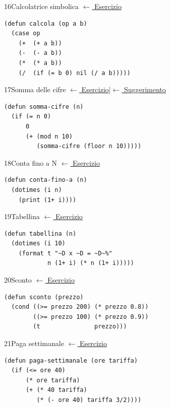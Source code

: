 \label{sol:16}
\begin{solbox}{16}{Calcolatrice simbolica}
\small\color{black!55}\hyperref[ex:16]{$\leftarrow$ Esercizio}\normalsize\color{black}
\begin{lstlisting}
(defun calcola (op a b)
  (case op
    (+  (+ a b))
    (-  (- a b))
    (*  (* a b))
    (/  (if (= b 0) nil (/ a b)))))
\end{lstlisting}
\end{solbox}

\label{sol:17}
\begin{solbox}{17}{Somma delle cifre}
\small\color{black!55}\hyperref[ex:17]{$\leftarrow$ Esercizio}\enspace\textcolor{black!30}{|}\enspace\hyperref[hint:17]{$\leftarrow$ Suggerimento}\normalsize\color{black}
\begin{lstlisting}
(defun somma-cifre (n)
  (if (= n 0)
      0
      (+ (mod n 10)
         (somma-cifre (floor n 10)))))
\end{lstlisting}
\end{solbox}

\label{sol:18}
\begin{solbox}{18}{Conta fino a N}
\small\color{black!55}\hyperref[ex:18]{$\leftarrow$ Esercizio}\normalsize\color{black}
\begin{lstlisting}
(defun conta-fino-a (n)
  (dotimes (i n)
    (print (1+ i))))
\end{lstlisting}
\end{solbox}

\label{sol:19}
\begin{solbox}{19}{Tabellina}
\small\color{black!55}\hyperref[ex:19]{$\leftarrow$ Esercizio}\normalsize\color{black}
\begin{lstlisting}
(defun tabellina (n)
  (dotimes (i 10)
    (format t "~D x ~D = ~D~%"
            n (1+ i) (* n (1+ i)))))
\end{lstlisting}
\end{solbox}

\label{sol:20}
\begin{solbox}{20}{Sconto}
\small\color{black!55}\hyperref[ex:20]{$\leftarrow$ Esercizio}\normalsize\color{black}
\begin{lstlisting}
(defun sconto (prezzo)
  (cond ((>= prezzo 200) (* prezzo 0.8))
        ((>= prezzo 100) (* prezzo 0.9))
        (t               prezzo)))
\end{lstlisting}
\end{solbox}

\label{sol:21}
\begin{solbox}{21}{Paga settimanale}
\small\color{black!55}\hyperref[ex:21]{$\leftarrow$ Esercizio}\normalsize\color{black}
\begin{lstlisting}
(defun paga-settimanale (ore tariffa)
  (if (<= ore 40)
      (* ore tariffa)
      (+ (* 40 tariffa)
         (* (- ore 40) tariffa 3/2))))
\end{lstlisting}
\end{solbox}

